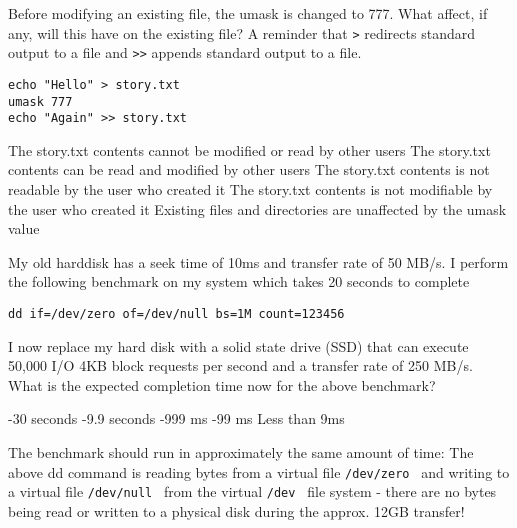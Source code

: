 

\variant
Before modifying an existing file, the umask is changed to 777. What affect, if any, will this have on the existing file? A reminder that {\tt >} redirects standard output to a file and {\tt >>} appends standard output to a file.
\begin{verbatim}
echo "Hello" > story.txt
umask 777
echo "Again" >> story.txt
\end{verbatim}
\begin{answers}
\answer The story.txt contents cannot be modified or read by other users
\answer The story.txt contents can be read and modified by other users
\answer The story.txt contents is not readable by the user who created it
\answer The story.txt contents is not modifiable by the user who created it
\correctanswer Existing files and directories are unaffected by the umask value
\end{answers}
\begin{solution}
\end{solution}

\variant
My old harddisk has a seek time of 10ms and transfer rate of 50 MB/s. I perform the following benchmark on my system which takes 20 seconds to complete
\begin{verbatim}
dd if=/dev/zero of=/dev/null bs=1M count=123456
\end{verbatim}
I now replace my hard disk with a solid state drive (SSD) that can execute 50,000 I/O 4KB block requests per second and a transfer rate of 250 MB/s. What is the expected completion time now for the above benchmark?
\begin{answers}
-30 seconds
-9.9 seconds
-999 ms
-99 ms
\answer  Less than 9ms
\end{answers}
\begin{solution}
The benchmark should run in approximately the same amount of time:
The above dd command is reading bytes from a virtual file {\tt /dev/zero } and writing to a virtual file {\tt /dev/null } from the virtual {\tt /dev } file system - there are no bytes being read or written to a physical disk during the approx. 12GB transfer!
\end{solution}

